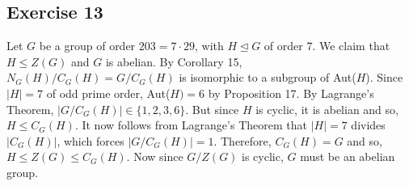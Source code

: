 \subsection*{Exercise 13}
Let $G$ be a group of order $203 = 7 \cdot 29$, with $H \trianglelefteq G$ of order 7. We claim that $H \le Z(G)$ and $G$ is abelian. By Corollary 15, $N_G(H)/C_G(H) = G/C_G(H)$ is isomorphic to a subgroup of Aut($H$). Since $|H| = 7$ of odd prime order, Aut($H) = 6$ by Proposition 17. By Lagrange's Theorem, $|G/C_G(H)| \in \{1,2,3,6\}$. But since $H$ is cyclic, it is abelian and so, $H \le C_G(H)$. It now follows from Lagrange's Theorem that $|H| = 7$ divides $|C_G(H)|$, which forces $|G/C_G(H)| = 1$. Therefore, $C_G(H) = G$ and so, $H \le Z(G) \le C_G(H)$. Now since $G/Z(G)$ is cyclic, $G$ must be an abelian group.